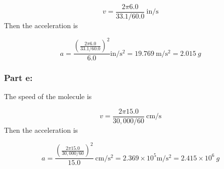 \documentclass{article}
\begin{document}
\[
	v = \frac{2 \pi 6.0}{33.1/60.0}\ \text{in}/\text{s}
\]
Then the acceleration is

\[
	a = \frac{\left(\frac{2 \pi 6.0}{33.1/60.0}\right)^2}{6.0} \text{in}/\text{s}^2 = 19.769\ \text{m}/\text{s}^2= \boxed{2.015\ g}
\]

\subsubsection*{Part e:}
The speed of the molecule is

\[
	v =\frac{2 \pi 15.0}{30,000/60}\ \text{cm}/\text{s}
\]
Then the acceleration is

\[
	a = \frac{\left(\frac{2 \pi 15.0}{30,000/60}\right)^2}{15.0}\ \text{cm}/\text{s}^2 = 2.369 \times 10^5 \text{m}/\text{s}^2 = 2.415 \times 10^6\ g
\]
\end{document}
